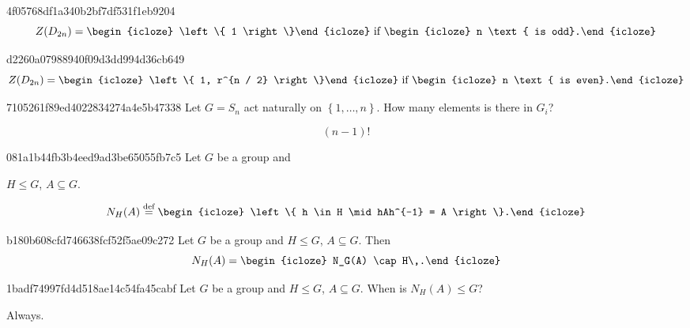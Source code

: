 \begin{note}{4f05768df1a340b2bf7df531f1eb9204}
    \[
        Z(D_{2n}) = \begin{icloze}{1}\left\{ 1 \right\}\end{icloze} \text{ if } \begin{icloze}{2}n \text{ is odd}.\end{icloze}
    \]
\end{note}

\begin{note}{d2260a07988940f09d3dd994d36cb649}
    \[
        Z(D_{2n}) = \begin{icloze}{1}\left\{ 1, r^{n / 2} \right\}\end{icloze} \text{ if } \begin{icloze}{2}n \text{ is even}.\end{icloze}
    \]
\end{note}

\begin{note}{7105261f89ed4022834274a4e5b47338}
    Let \({ G = S_n }\) act naturally on \({ \left\{ 1, \ldots, n \right\} }\).
    How many elements is there in \({ G_i }\)?

    \begin{cloze}{1}
        \[
            (n-1)!
        \]
    \end{cloze}
\end{note}

\begin{note}{081a1b44fb3b4eed9ad3be65055fb7c5}
    Let \({ G }\) be a group and \begin{icloze}{2}\({ H \leq G }\), \({ A \subseteq G }\).\end{icloze}
    \[
        N_H(A) \overset{\text{def}}= \begin{icloze}{1}\left\{ h \in H \mid hAh^{-1} = A \right\}.\end{icloze}
    \]
\end{note}

\begin{note}{b180b608cfd746638fcf52f5ae09c272}
    Let \({ G }\) be a group and \({ H \leq G }\), \({ A \subseteq G }\).
    Then
    \[
        N_H(A) = \begin{icloze}{1}N_G(A) \cap H\,.\end{icloze}
    \]
\end{note}

\begin{note}{1badf74997fd4d518ae14c54fa45cabf}
    Let \({ G }\) be a group and \({ H \leq G }\), \({ A \subseteq G }\).
    When is \({ N_H(A) \leq G }\)?

    \begin{cloze}{1}
        Always.
    \end{cloze}
\end{note}

